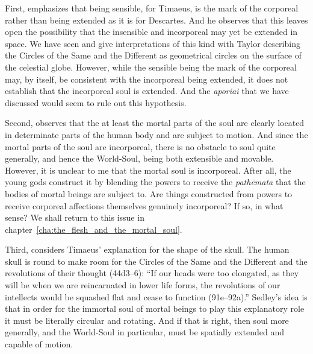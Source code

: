 First, \citet[329--30]{Sedley:1997kr} emphasizes that being sensible, for Timaeus, is the mark of the corporeal rather than being extended as it is for Descartes. And he observes that this leaves open the possibility that the insensible and incorporeal may yet be extended in space. We have seen \citet[111--2 n7]{Archer-Hind:1888qd} and \citet[148]{Taylor:1928qb} give interpretations of this kind with Taylor describing the Circles of the Same and the Different as geometrical circles on the surface of the celestial globe. However, while the sensible being the mark of the corporeal may, by itself, be consistent with the incorporeal being extended, it does not establish that the incorporeal soul is extended. And the \emph{aporiai} that we have discussed would seem to rule out this hypothesis.

Second, \citet[330]{Sedley:1997kr} observes that the at least the mortal parts of the soul are clearly located in determinate parts of the human body and are subject to motion. And since the mortal parts of the soul are incorporeal, there is no obstacle to soul quite generally, and hence the World-Soul, being both extensible and movable. However, it is unclear to me that the mortal soul is incorporeal. After all, the young gods construct it by blending the powers to receive the \emph{pathēmata} that the bodies of mortal beings are subject to. Are things constructed from powers to receive corporeal affections themselves genuinely incorporeal? If so, in what sense? We shall return to this issue in chapter~\ref{cha:the_flesh_and_the_mortal_soul}.

Third, \citet[330]{Sedley:1997kr} considers Timaeus' explanation for the shape of the skull. The human skull is round to make room for the Circles of the Same and the Different and the revolutions of their thought (44d3--6): ``If our heads were too elongated, as they will be when we are reincarnated in lower life forms, the revolutions of our intellects would be squashed flat and cease to function (91e--92a).'' Sedley's idea is that in order for the immortal soul of mortal beings to play this explanatory role it must be literally circular and rotating. And if that is right, then soul more generally, and the World-Soul in particular, must be spatially extended and capable of motion. 

